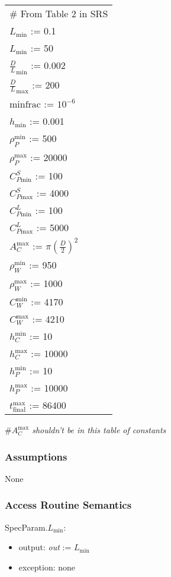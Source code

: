 \documentclass[12pt]{article}
\begin{document}
\renewcommand{\arraystretch}{1.2}
\begin{longtable*}[l]{l} 
\# From Table 2 in SRS\\
  $L_\text{min}$ := 0.1\\
  $L_\text{min}$ := 50\\
  ${\frac{D}{L}}_\text{min}$ := 0.002 \\
  ${\frac{D}{L}}_\text{max}$ := 200 \\
  $\text{minfrac} $ := $10^{-6}$\\
  $h_\text{min}$ := 0.001 \\
  $\rho_P^{\text{min}}$ := 500\\
  $\rho_P^{\text{max}}$ := 20000\\
  $C_{P\text{min}}^S$ := 100 \\
  $C_{P\text{max}}^S$ := 4000\\
  $C_{P\text{min}}^L$ := 100 \\
  $C_{P\text{max}}^L$ := 5000\\
  $A_C^{\text{max}}$ := $\pi(\frac{D}{2})^2$\\
  $\rho_W^{\text{min}}$ := 950\\
  $\rho_W^{\text{max}}$ := 1000\\
  $C_W^{\text{min}}$ := 4170\\
  $C_W^{\text{max}}$ := 4210\\
  $h_C^{\text{min}}$ := 10\\
  $h_C^{\text{max}}$ := 10000\\
  $h_P^{\text{min}}$ := 10\\
  $h_P^{\text{max}}$ := 10000\\
  $t_{\text{final}}^{\text{max}}$ := 86400\\
\end{longtable*}

\#\textit{$A_C^{\text{max}}$ shouldn't be in this table of constants}

\subsubsection{Assumptions}

None

\subsubsection{Access Routine Semantics}

\noindent SpecParam.$L_\text{min}$:
\begin{itemize}
\item output: \textit{out} := $L_\text{min}$
\item exception: none
\end{itemize}
\end{document}
